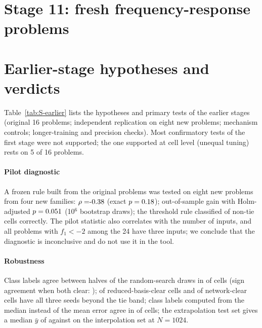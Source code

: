 \documentclass[preprint,11pt]{elsarticle}
\begin{document}
\section{Stage 11: fresh frequency-response problems}\label{sec:S-stage11}
\begin{table}[h]\centering\caption{The four fresh frequency-response problems; $p$ inputs, $m$ outputs (real and imaginary parts).}\label{tab:S-sdproblems}\scriptsize\setlength{\tabcolsep}{3pt}\end{table}

\section{Earlier-stage hypotheses and verdicts}\label{sec:S-earlier}
Table~\ref{tab:S-earlier} lists the hypotheses and primary tests of the earlier stages (original 16 problems; independent replication on eight new problems; mechanism controls; longer-training and precision checks). Most confirmatory tests of the first stage were not supported; the one supported at cell level (unequal tuning) rests on 5 of 16 problems.
\begin{table}[h]\centering\caption{Earlier-stage tests. $\bar y$ as in \eqref{eq:y}.}\label{tab:S-earlier}\footnotesize\resizebox{\textwidth}{!}{}\end{table}
\paragraph{Pilot diagnostic} A frozen rule built from the original problems was tested on eight new problems from four new families: $\rho=\PoneRho$ (exact $p=0.18$); out-of-sample gain \PtwoGain{} with Holm-adjusted $p=0.051$ (10$^6$ bootstrap draws); the threshold rule classified \SoneCorrect{} of \SoneN{} non-tie cells correctly. The pilot statistic also correlates with the number of inputs, and all problems with $f_1<-2$ among the 24 have three inputs; we conclude that the diagnostic is inconclusive and do not use it in the tool.
\paragraph{Robustness} Class labels agree between halves of the random-search draws in \DrawAgree{} of cells (sign agreement when both clear: \DrawSign); \SeedAllLs{} of reduced-basis-clear cells and \SeedAllNl{} of network-clear cells have all three seeds beyond the tie band; class labels computed from the median instead of the mean error agree in \MetricAgreeMed{} of cells; the extrapolation test set gives a median $\bar y$ of \ExtMedianExt{} against \ExtMedianInterp{} on the interpolation set at $N=1024$.
\end{document}

